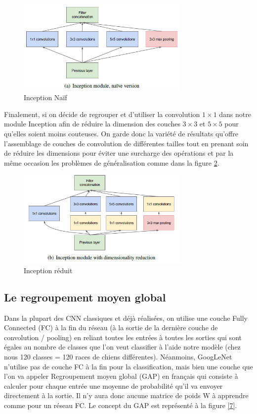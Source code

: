 \documentclass{article}
\begin{document}
\begin{figure}[htbp]
    \includegraphics[width=8.4cm]{./figures/Figure5.png} 
    \caption{Inception Naïf}
    \label{5} 
\end{figure} 

Finalement, si on décide de regrouper et d’utiliser la convolution $1\times 1$
dans notre module Inception afin de réduire la dimension des couches $3\times 3$
et  $5\times 5$ pour qu’elles soient moins couteuses. On garde donc la variété
de résultats qu’offre l’assemblage de couches de convolution de différentes
tailles tout en prenant soin de réduire les dimensions pour éviter une surcharge
des opérations et par la même occasion les problèmes de généralisation comme
dans la figure \ref{6}. ~\cite{43022}

\begin{figure}[htbp]
    \includegraphics[width=8.4cm]{./figures/Figure6.png} 
    \caption{Inception réduit}
    \label{6} 
\end{figure} 

\subsection{Le regroupement moyen global}
Dans la plupart des CNN classiques et déjà réalisées, on utilise une couche
Fully Connected (FC) à la fin du réseau (à la sortie de la dernière couche de
convolution / pooling) en reliant toutes les entrées à toutes les sorties qui
sont égales au nombre de classes que l’on veut classifier à l’aide notre modèle
(chez nous 120 classes = 120 races de chiens différentes). Néanmoins, GoogLeNet
 n’utilise pas de couche FC à la fin pour la classification, mais bien une
couche que l’on va appeler Regroupement moyen global (GAP) en français qui
consiste à calculer pour chaque entrée une moyenne de probabilité qu’il va
envoyer directement à la sortie. Il n’y aura donc aucune matrice de poids W à
apprendre comme pour un réseau FC. Le concept du GAP est représenté à la figure
\ref{7}. ~\cite{tsang_2018}
\end{document}
